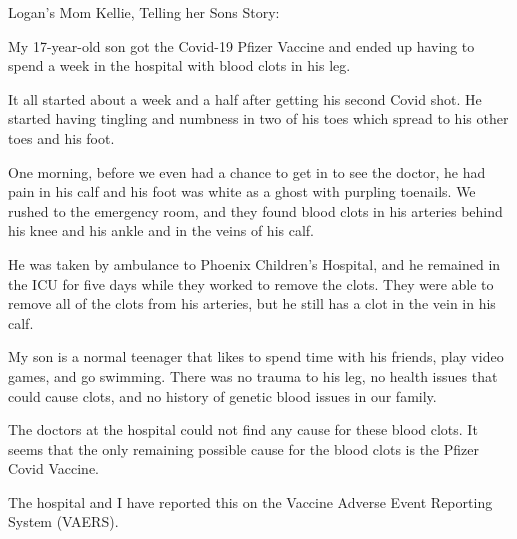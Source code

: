Logan’s Mom Kellie, Telling her Sons Story:

My 17-year-old son got the Covid-19 Pfizer Vaccine and ended up having to spend
a week in the hospital with blood clots in his leg.

It all started about a week and a half after getting his second Covid shot. He
started having tingling and numbness in two of his toes which spread to his
other toes and his foot.

One morning, before we even had a chance to get in to see the doctor, he had
pain in his calf and his foot was white as a ghost with purpling toenails. We
rushed to the emergency room, and they found blood clots in his arteries behind
his knee and his ankle and in the veins of his calf.

He was taken by ambulance to Phoenix Children’s Hospital, and he remained in the
ICU for five days while they worked to remove the clots. They were able to
remove all of the clots from his arteries, but he still has a clot in the vein
in his calf.

My son is a normal teenager that likes to spend time with his friends, play
video games, and go swimming. There was no trauma to his leg, no health issues
that could cause clots, and no history of genetic blood issues in our family.

The doctors at the hospital could not find any cause for these blood clots. It
seems that the only remaining possible cause for the blood clots is the Pfizer
Covid Vaccine.

The hospital and I have reported this on the Vaccine Adverse Event Reporting
System (VAERS).
